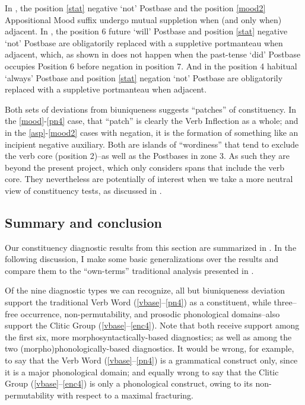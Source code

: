 \documentclass[output=paper]{langscibook}
\begin{document}
In , the position \ref{stat} negative `not' Postbase and the position \ref{mood2} Appositional Mood suffix undergo mutual suppletion when (and only when) adjacent. In , the position 6 future `will' Postbase and position \ref{stat} negative `not' Postbase are obligatorily replaced with a suppletive portmanteau when adjacent, which, as shown in  does not happen when the past-tense `did' Postbase occupies Position 6 before negation in position 7. And in  the position 4 habitual `always' Postbase and position \ref{stat} negation `not' Postbase are obligatorily replaced with a suppletive portmanteau when adjacent.

Both sets of deviations from biuniqueness suggests “patches” of constituency. In the \ref{mood}-\ref{pn4} case, that “patch” is clearly the Verb Inflection as a whole; and in the \ref{asp}-\ref{mood2} cases with negation, it is the formation of something like an incipient negative auxiliary. Both are islands of “wordiness” that tend to exclude the verb core (position 2)--as well as the Postbases in zone 3. As such they are beyond the present project, which only considers spans that include the verb core. They nevertheless are potentially of interest when we take a more neutral view of constituency tests, as discussed in .

\subsection{Summary and conclusion} \label{sec:5.9}
\largerpage
Our constituency diagnostic results from this section are summarized in . In the following discussion, I make some basic generalizations over the results and compare them to the “own-terms” traditional analysis presented in .

Of the nine diagnostic types we can recognize, all but biuniqueness deviation support the traditional Verb Word (\ref{vbase}--\ref{pn4}) as a constituent, while three--free occurrence, non-permutability, and prosodic phonological domains--also support the Clitic Group (\ref{vbase}--\ref{enc4}). Note that both receive support among the first six, more morphosyntactically-based diagnostics; as well as among the two (morpho)pho\-no\-logically-based diagnostics. It would be wrong, for example, to say that the Verb Word (\ref{vbase}--\ref{pn4}) is a grammatical construct only, since it is a major phonological domain; and equally wrong to say that the Clitic Group (\ref{vbase}--\ref{enc4}) is only a phonological construct, owing to its non-permutability with respect to a maximal fracturing.
\end{document}
